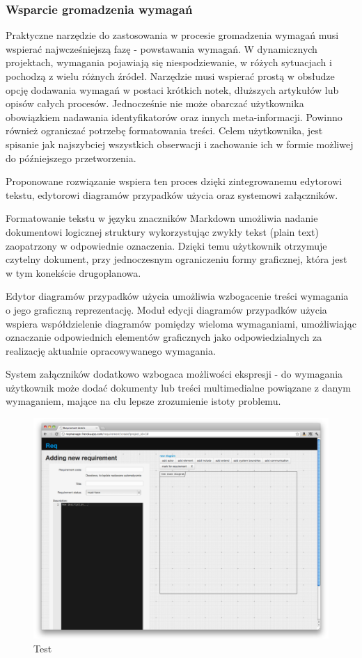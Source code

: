     \subsubsection{Wsparcie gromadzenia wymagań}
      Praktyczne narzędzie do zastosowania w procesie gromadzenia wymagań musi wspierać najwcześniejszą fazę - powstawania wymagań. W dynamicznych projektach, wymagania pojawiają się niespodziewanie, w różych sytuacjach i pochodzą z wielu różnych źródeł. Narzędzie musi wspierać prostą w obsłudze opcję dodawania wymagań w postaci krótkich notek, dłuższych artykułów lub opisów całych procesów. Jednocześnie nie może obarczać użytkownika obowiązkiem nadawania identyfikatorów oraz innych meta-informacji. Powinno również ograniczać potrzebę formatowania treści. Celem użytkownika, jest spisanie jak najszybciej wszystkich obserwacji i zachowanie ich w formie możliwej do późniejszego przetworzenia.

      Proponowane rozwiązanie wspiera ten proces dzięki zintegrowanemu edytorowi tekstu, edytorowi diagramów przypadków użycia oraz systemowi załączników.
      
      Formatowanie tekstu w języku znaczników Markdown \cite{Grub04} umożliwia nadanie dokumentowi logicznej struktury wykorzystując zwykły tekst (plain text) zaopatrzony w odpowiednie oznaczenia. Dzięki temu użytkownik otrzymuje czytelny dokument, przy jednoczesnym ograniczeniu formy graficznej, która jest w tym konekście drugoplanowa.

      Edytor diagramów przypadków użycia umożliwia wzbogacenie treści wymagania o jego graficzną reprezentację. Moduł edycji diagramów przypadków użycia wspiera współdzielenie diagramów pomiędzy wieloma wymaganiami, umożliwiając oznaczanie odpowiednich elementów graficznych jako odpowiedzialnych za realizację aktualnie opracowywanego wymagania.

      System załączników dodatkowo wzbogaca możliwości ekspresji - do wymagania użytkownik może dodać dokumenty lub treści multimedialne powiązane z danym wymaganiem, mające na clu lepsze zrozumienie istoty problemu.

      \begin{figure}[t]
        \centering
        \includegraphics[width=1.0\textwidth]{screen_test.pdf}
        \caption{Test}
      \end{figure}

